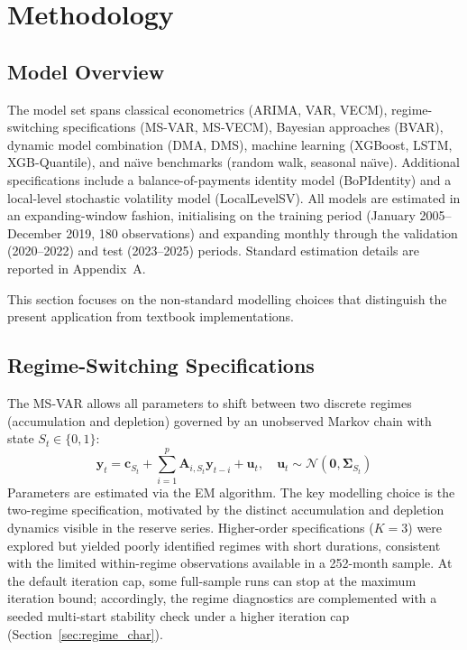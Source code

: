 \documentclass[12pt,a4paper]{article}
\begin{document}
\section{Methodology}

\subsection{Model Overview}

The model set spans classical econometrics (ARIMA, VAR, VECM), regime-switching specifications (MS-VAR, MS-VECM), Bayesian approaches (BVAR), dynamic model combination (DMA, DMS), machine learning (XGBoost, LSTM, XGB-Quantile), and na\"{\i}ve benchmarks (random walk, seasonal na\"{\i}ve). Additional specifications include a balance-of-payments identity model (BoPIdentity) and a local-level stochastic volatility model (LocalLevelSV). All models are estimated in an expanding-window fashion, initialising on the training period (January 2005--December 2019, 180 observations) and expanding monthly through the validation (2020--2022) and test (2023--2025) periods. Standard estimation details are reported in Appendix~A.

This section focuses on the non-standard modelling choices that distinguish the present application from textbook implementations.

\subsection{Regime-Switching Specifications}

The MS-VAR allows all parameters to shift between two discrete regimes (accumulation and depletion) governed by an unobserved Markov chain with state $S_t \in \{0, 1\}$:
\[
\mathbf{y}_t = \mathbf{c}_{S_t} + \sum_{i=1}^{p} \mathbf{A}_{i,S_t} \mathbf{y}_{t-i} + \mathbf{u}_t, \quad \mathbf{u}_t \sim \mathcal{N}(\mathbf{0}, \boldsymbol{\Sigma}_{S_t})
\]
Parameters are estimated via the EM algorithm. The key modelling choice is the two-regime specification, motivated by the distinct accumulation and depletion dynamics visible in the reserve series. Higher-order specifications ($K = 3$) were explored but yielded poorly identified regimes with short durations, consistent with the limited within-regime observations available in a 252-month sample. At the default iteration cap, some full-sample runs can stop at the maximum iteration bound; accordingly, the regime diagnostics are complemented with a seeded multi-start stability check under a higher iteration cap (Section~\ref{sec:regime_char}).
\end{document}
